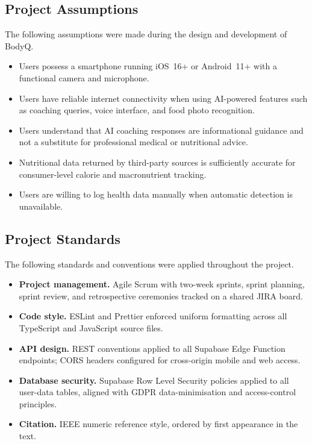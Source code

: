 \subsection{Project Assumptions}

The following assumptions were made during the design and development of
BodyQ.

\begin{itemize}
	\item Users possess a smartphone running iOS~16+ or Android~11+ with a
	functional camera and microphone.
	
	\item Users have reliable internet connectivity when using AI-powered
	features such as coaching queries, voice interface, and food photo
	recognition.
	
	\item Users understand that AI coaching responses are informational
	guidance and not a substitute for professional medical or nutritional
	advice.
	
	\item Nutritional data returned by third-party sources is sufficiently
	accurate for consumer-level calorie and macronutrient tracking.
	
	\item Users are willing to log health data manually when automatic
	detection is unavailable.
\end{itemize}

\subsection{Project Standards}

The following standards and conventions were applied throughout the project.

\begin{itemize}
	\item \textbf{Project management.} Agile Scrum with two-week sprints,
	sprint planning, sprint review, and retrospective ceremonies tracked on
	a shared JIRA board.
	
	\item \textbf{Code style.} ESLint and Prettier enforced uniform
	formatting across all TypeScript and JavaScript source files.
	
	\item \textbf{API design.} REST conventions applied to all Supabase
	Edge Function endpoints; CORS headers configured for cross-origin
	mobile and web access.
	
	\item \textbf{Database security.} Supabase Row Level Security policies
	applied to all user-data tables, aligned with GDPR data-minimisation
	and access-control principles.
	
	\item \textbf{Citation.} IEEE numeric reference style, ordered by
	first appearance in the text.
\end{itemize}

